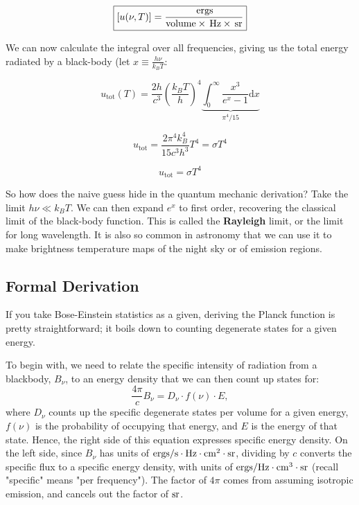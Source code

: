 \documentclass{article}
\newcommand{\unit}[1]{{\,\rm #1}}
\newcommand{\ergs}{\unit{ergs}}
\newcommand{\sr}{\unit{sr}}
\newcommand{\hz}{\unit{Hz}}
\begin{document}
\begin{equation}
    \boxed{[u(\nu, T)] = \frac{\ergs}{\text{volume}\times\hz\times\sr}}
\end{equation}

We can now calculate the integral over all frequencies, giving us the total energy radiated by a black-body (let $x \equiv \frac{h\nu}{k_B T}$:

\begin{equation}
    u_{\text{tot}}(T) = \frac{2 h}{c^3}\left(\frac{k_B T}{h}\right)^4 \underbrace{\int_0^\infty \frac{x^3}{e^x -1} \mathrm{d} x}_{\pi^4/15}
\end{equation}

\begin{equation}
    u_{\text{tot}} = \frac{2\pi ^4 k_B^4}{15 c^3 h^3 } T^4 = \sigma T^4 
\end{equation}

\begin{equation}
    \boxed{u_{\text{tot}} = \sigma T^4}
\end{equation}

So how does the naive guess hide in the quantum mechanic derivation? Take the limit $h \nu \ll k_B T$. We can then expand $e^x$ to first order, recovering the classical limit of the black-body function. This is called the \textbf{Rayleigh} limit, or the limit for long wavelength. It is also so common in astronomy that we can use it to make brightness temperature maps of the night sky or of emission regions. 

\subsection{Formal Derivation}

If you take Bose-Einstein statistics as a given, deriving the Planck function is pretty straightforward; it boils down to counting degenerate states for a given energy.

To begin with, we need to relate the specific intensity of radiation from a blackbody, $B_\nu$, to an energy density that we can then count up states for:
\begin{equation}
\frac{4\pi}{c}B_\nu=D_\nu\cdot f(\nu)\cdot E,
\end{equation}
where $D_\nu$ counts up the specific degenerate states per volume for a given energy, $f(\nu)$ is the probability
of occupying that energy, and $E$ is the energy of that state.  Hence, the right side of this equation expresses specific energy density.  On the left side,
since $B_\nu$ has units of ${\rm ergs}/{\rm s}\cdot{\rm Hz}\cdot{\rm cm^2}\cdot{\rm sr}$, dividing by $c$ converts the specific flux to a specific
energy density, with units of ${\rm ergs}/{\rm Hz}\cdot{\rm cm^3}\cdot{\rm sr}$ (recall "specific" means "per frequency").  The factor of $4\pi$ comes
from assuming isotropic emission, and cancels out the factor of ${\rm sr}$.
\end{document}
